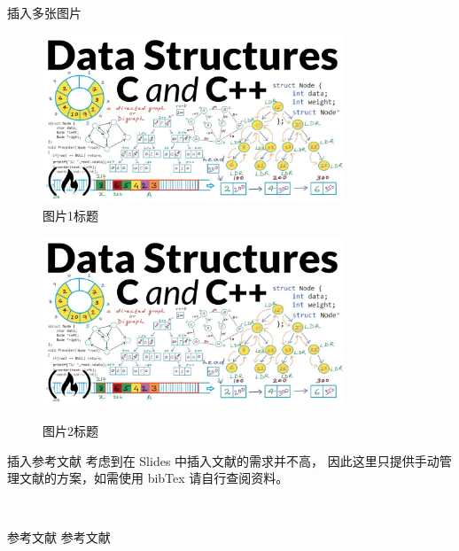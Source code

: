 \documentclass[12pt]{beamer}
\begin{document}
\begin{frame}{插入多张图片}
    \begin{figure}[H]
        \centering
        \begin{minipage}[c]{0.40\textwidth} %
        \centering
        \includegraphics[width=0.8\textwidth]{assets/dataStructures.jpg}\\
        \caption{图片1标题}
        \end{minipage}
        \hspace{1em}
        \begin{minipage}[c]{0.40\textwidth} %
        \centering
        \includegraphics[width=0.8\textwidth]{assets/dataStructures.jpg}\\
        \caption{图片2标题}
        \end{minipage}
    \end{figure}
\end{frame}

\begin{frame}{插入参考文献}
    考虑到在 Slides 中插入文献的需求并不高，
    因此这里只提供手动管理文献的方案，如需使用 bibTex 请自行查阅资料。

    ~\par

    \begin{thebibliography}{99}
         参考文献
         参考文献
    \end{thebibliography}
\end{frame}

\end{document}
